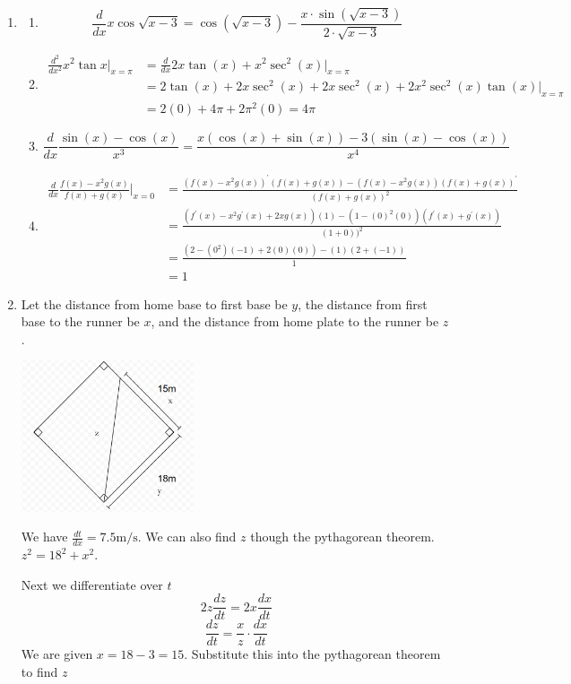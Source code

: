 \documentclass[11pt, letterpaper, twoside]{article}
\begin{document}
\begin{enumerate}
\begin{enumerate}[label=(\alph*)]
\end{enumerate}
\item \begin{enumerate}[label=(\alph*)]
\item $$\frac{d}{dx}x\cos\sqrt{x-3}=\cos(\sqrt{x-3})-\frac{x\cdot\sin(\sqrt {x-3})}{2\cdot\sqrt{x-3}}$$
\item
\begin{align*}
\frac{d^2}{dx^2}x^2\tan x|_{x=\pi}&=\frac{d}{dx}2x\tan(x)+x^2\sec^2 (x)|_{x=\pi}\\
&=2\tan(x)+2x\sec^2(x)+2x\sec^2(x)+2x^2\sec^2(x)\tan(x)|_{x=\pi}\\
&=2(0)+4\pi+2\pi^2(0)=\boxed{4\pi}
\end{align*}
\item \[\frac{d}{dx}\frac{\sin(x)-\cos(x)}{x^3}=\frac{x(\cos(x)+\sin(x))-3(\sin(x)-\cos(x))}{x^4}\]
\item
\begin{align*}\frac{d}{dx}\frac{f(x)-x^2g(x)}{f(x)+g(x)}|_{x=0}&=\frac{(f(x)-x^2g(x))^\prime(f(x)+g(x))-(f(x)-x^2g(x))(f(x)+g(x))^\prime}{(f(x)+g(x))^2}\\
&=\frac{(f^\prime(x)-x^2g^\prime(x)+2xg(x))(1)-(1-(0)^2(0))(f^\prime(x)+g^\prime(x))}{(1+0))^2}\\
&=\frac{(2-(0^2)(-1)+2(0)(0))-(1)(2+(-1))}{1}\\
&= 1
\end{align*}%
\end{enumerate}
\item 

Let the distance from home base to first base be \(y\), the distance from first base to the runner be \(x\), and the distance from home plate to the runner be \(z\).

\includegraphics[width=0.4\textwidth]{q3}

We have \(\frac{dt}{dx}=7.5\text{m/s}\). We can also find \(z\) though the pythagorean theorem. \(z^2=18^2+x^2\).

Next we differentiate over \(t\)
\[2z\frac{dz}{dt}=2x\frac{dx}{dt}\]
\[\frac{dz}{dt}=\frac{x}{z}\cdot\frac{dx}{dt}\]
We are given \(x=18-3=15\). Substitute this into the pythagorean theorem to find \(z\)


\end{enumerate}
\end{document}
